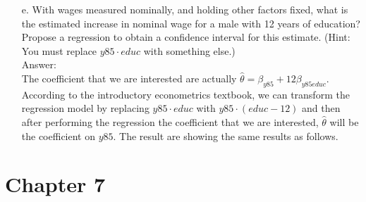 \documentclass[10pt]{article}
\begin{document}
\begin{enumerate}
\item[e.] With wages measured nominally, and holding other factors fixed, what is the estimated increase in nominal wage for a male with 12 years of education? Propose a regression to obtain a confidence interval for this estimate. (Hint: You must replace $y85\cdot educ$ with something else.)
\\ Answer: \\
The coefficient that we are interested are actually $\hat{\theta}=\beta_{y85}+12\beta_{y85educ}$. According to the introductory econometrics textbook, we can transform the regression model by replacing $y85\cdot educ$ with $y85\cdot (educ-12)$ and then after performing the regression the coefficient that we are interested, $\hat{\theta}$ will be the coefficient on $y85$. The result are showing the same results as follows.\\


\end{enumerate}

\section*{Chapter 7}
\end{document}
